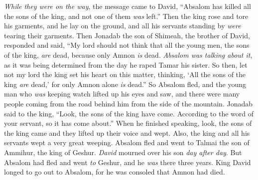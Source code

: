\begin{biblechapter}
\verse \textit{While they were on the way}, the message came to David, “Absalom has killed all the sons of the king, and not one of them \textit{was} left.”
\verse Then the king rose and tore his garments, and he lay on the ground, and all his servants standing by \textit{were} tearing their garments.
\verse Then Jonadab the son of Shimeah, the brother of David, responded and said, “My lord should not think that all the young men, the sons of the king, \textit{are} dead, because only Amnon \textit{is} dead. \textit{Absalom was talking about it}, as it was being determined from the day he raped Tamar his sister.
\verse So then, let not my lord the king set his heart on this matter, thinking, ‘All the sons of the king \textit{are} dead,’ for only Amnon alone \textit{is} dead.”
 So Absalom fled, and the young man who \textit{was} keeping watch lifted up his eyes and saw, and there were many people coming from the road behind him from the side of the mountain.
\verse Jonadab said to the king, “Look, the sons of the king have come. According to the word of your servant, so it has come about.”
\verse When he finished speaking, look, the sons of the king came and they lifted up their voice and wept. Also, the king and all his servants wept a very great weeping.
\verse Absalom fled and went to Talmai the son of Ammihur, the king of Geshur. \textit{David} mourned over his son \textit{day after day}.
\verse But Absalom had fled and went \textit{to} Geshur, and he \textit{was} there three years.
\verse King David longed to go out to Absalom, for he was consoled that Amnon had died.
\end{biblechapter}

